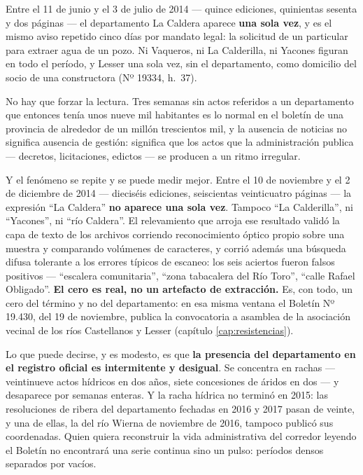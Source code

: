 Entre el 11 de junio y el 3 de julio de 2014 --- quince ediciones, quinientas sesenta y dos páginas --- el departamento La Caldera aparece \textbf{una sola vez}, y es el mismo aviso repetido cinco días por mandato legal: la solicitud de un particular para extraer agua de un pozo. Ni Vaqueros, ni La Calderilla, ni Yacones figuran en todo el período, y Lesser una sola vez, sin el departamento, como domicilio del socio de una constructora (Nº 19334, h.\ 37).

No hay que forzar la lectura. Tres semanas sin actos referidos a un departamento que entonces tenía unos nueve mil habitantes es lo normal en el boletín de una provincia de alrededor de un millón trescientos mil, y la ausencia de noticias no significa ausencia de gestión: significa que los actos que la administración publica --- decretos, licitaciones, edictos --- se producen a un ritmo irregular.

Y el fenómeno se repite y se puede medir mejor. Entre el 10 de noviembre y el 2 de diciembre de 2014 --- dieciséis ediciones, seiscientas veinticuatro páginas --- la expresión ``La Caldera'' \textbf{no aparece una sola vez}. Tampoco ``La Calderilla'', ni ``Yacones'', ni ``río Caldera''. El relevamiento que arroja ese resultado validó la capa de texto de los archivos corriendo reconocimiento óptico propio sobre una muestra y comparando volúmenes de caracteres, y corrió además una búsqueda difusa tolerante a los errores típicos de escaneo: los seis aciertos fueron falsos positivos --- ``escalera comunitaria'', ``zona tabacalera del Río Toro'', ``calle Rafael Obligado''. \textbf{El cero es real, no un artefacto de extracción.} Es, con todo, un cero del término y no del departamento: en esa misma ventana el Boletín Nº 19.430, del 19 de noviembre, publica la convocatoria a asamblea de la asociación vecinal de los ríos Castellanos y Lesser (capítulo \ref{cap:resistencias}).

Lo que puede decirse, y es modesto, es que \textbf{la presencia del departamento en el registro oficial es intermitente y desigual}. Se concentra en rachas --- veintinueve actos hídricos en dos años, siete concesiones de áridos en dos --- y desaparece por semanas enteras. Y la racha hídrica no terminó en 2015: las resoluciones de ribera del departamento fechadas en 2016 y 2017 pasan de veinte, y una de ellas, la del río Wierna de noviembre de 2016, tampoco publicó sus coordenadas. Quien quiera reconstruir la vida administrativa del corredor leyendo el Boletín no encontrará una serie continua sino un pulso: períodos densos separados por vacíos.

